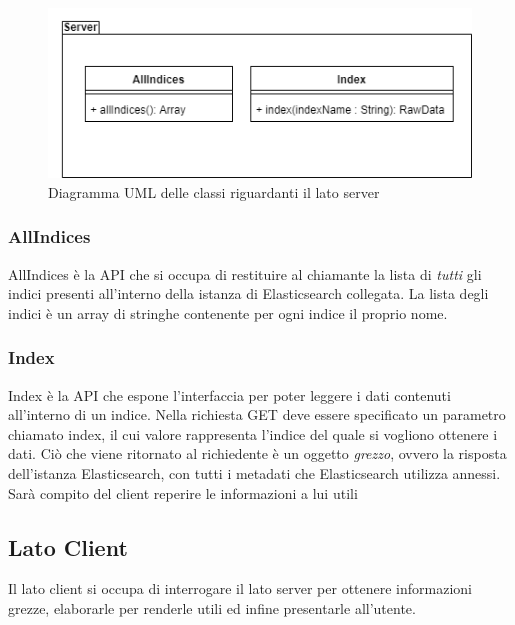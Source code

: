 \begin{figure}[h]
	\centering
	\includegraphics[width=1\textwidth]{Images/DiagrammaClassiServer.png}
	\caption{Diagramma UML delle classi riguardanti il lato server}
	\label{img:diagrammaClassiServer}
\end{figure}

\subsubsection{AllIndices}
AllIndices è la API che si occupa di restituire al chiamante la lista di \emph{tutti} gli indici presenti all'interno della istanza di Elasticsearch collegata. La lista degli indici è un array di stringhe contenente per ogni indice il proprio nome.

\subsubsection{Index}
Index è la API che espone l'interfaccia per poter leggere i dati contenuti all'interno di un indice. Nella richiesta GET deve essere specificato un parametro chiamato index, il cui valore rappresenta l'indice del quale si vogliono ottenere i dati. Ciò che viene ritornato al richiedente è un oggetto \emph{grezzo}, ovvero la risposta dell'istanza Elasticsearch, con tutti i metadati che Elasticsearch utilizza annessi. Sarà compito del client reperire le informazioni a lui utili

\subsection{Lato Client}
Il lato client si occupa di interrogare il lato server per ottenere informazioni grezze, elaborarle per renderle utili ed infine presentarle all'utente.

\label{sec:Componenti}
